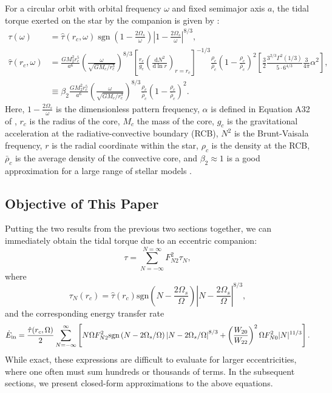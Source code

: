\documentclass[
        fleqn,
        usenatbib,
        referee,
    ]{mnras}
\newcommand*{\rd}[2]{\frac{\mathrm{d}#1}{\mathrm{d}#2}}
\newcommand*{\abs}[1]{\left|#1\right|}
\newcommand*{\p}[1]{\left(#1\right)}
\newcommand*{\s}[1]{\left[#1\right]}
\DeclareMathOperator*{\sgn}{sgn}
\begin{document}
For a circular orbit with orbital frequency $\omega$ and fixed semimajor axis
$a$, the tidal torque exerted on the star by the companion is given by
\citealt{kushnir}:
\begin{align}
    \tau(\omega) &= \hat{\tau}(r_c, \omega) \sgn\p{1 - \frac{2\Omega_s}{\omega}}
        \abs{1 - \frac{2\Omega_s}{\omega}}^{8/3}
            \label{eq:kushnir_torque},\\
    \hat{\tau}(r_c, \omega) &= \frac{GM_2^2r_c^5}{a^6}
        \p{\frac{\omega}{\sqrt{GM_c/r_c^3}}}^{8/3}
        \s{\frac{r_c}{g_c}\p{\rd{N^2}{\ln r}}_{r = r_c}}^{-1/3}
            \frac{\rho_c}{\bar{\rho}_c} \p{1 - \frac{\rho_c}{\bar{\rho}_c}}^2
            \s{\frac{3}{2}\frac{3^{2/3}\Gamma^2(1/3)}{5 \cdot
                6^{4/3}} \frac{3}{4\pi}\alpha^2},\nonumber\\
        &\equiv \beta_2\frac{GM_2^2r_c^5}{a^6}
            \p{\frac{\omega}{\sqrt{GM_c/r_c^3}}}^{8/3}
            \frac{\rho_c}{\bar{\rho}_c} \p{1 - \frac{\rho_c}{\bar{\rho}_c}}^2.
\end{align}
Here, $1 - \frac{2\Omega_s}{\omega}$ is the dimensionless pattern frequency,
$\alpha$ is defined in Equation A32 of \citealt{kushnir}, $r_c$ is the radius of
the core, $M_c$ the mass of the core, $g_c$ is the gravitational acceleration at
the radiative-convective boundary (RCB), $N^2$ is the Brunt-Vaisala frequency,
$r$ is the radial coordinate within the star, $\rho_c$ is the density at the
RCB, $\bar{\rho}_c$ is the average density of the convective core, and $\beta_2
\approx 1$ is a good approximation for a large range of stellar models
\citep{kushnir}.

\subsection{Objective of This Paper}

Putting the two results from the previous two sections together, we can
immediately obtain the tidal torque due to an eccentric companion:
\begin{equation}
    \tau = \sum_{N = -\infty}^{N = \infty} F_{N2}^2 \tau_N,
\end{equation}
where
\begin{equation}
    \tau_N(r_c) = \hat{\tau}(r_c) \mathrm{sgn}\left(N - \frac{2\Omega_s}{
        \Omega}\right) \left|N - \frac{2 \Omega_s}{\Omega}\right|^{8/3},
\end{equation}
and the corresponding energy transfer rate
\begin{equation}
    \dot{E}_{\rm in} = \frac{\hat{\tau}(r_c, \Omega)}{2}
        \sum_{N = -\infty}^{\infty} \left[
            N\Omega F_{N2}^2 \mathrm{sgn}\left(N - 2\Omega_s / \Omega\right)
                    \left|N - 2 \Omega_s / \Omega\right|^{8/3}
            + \left(\frac{W_{20}}{W_{22}}\right)^2 \Omega
                    F_{N0}^2 |N|^{11/3}
            \right].
\end{equation}
While exact, these expressions are difficult to evaluate for larger
eccentricities, where one often must sum hundreds or thousands of terms. In the
subsequent sections, we present closed-form approximations to the above
equations.
\end{document}

